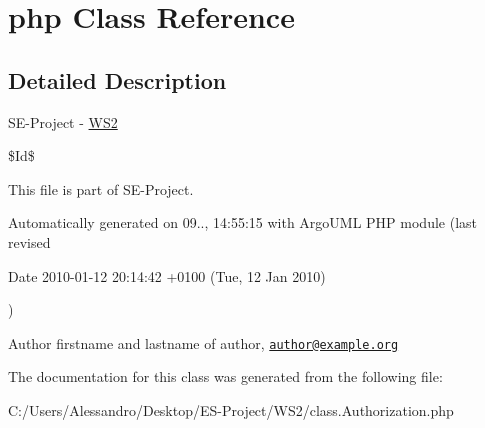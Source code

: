 \hypertarget{class_1_1_authorization_1_1php}{\section{php Class Reference}
\label{class_1_1_authorization_1_1php}
}


\subsection{Detailed Description}
S\+E-\/\+Project -\/ \hyperlink{namespace_w_s2}{W\+S2}

\$\+Id\$

This file is part of S\+E-\/\+Project.

Automatically generated on 09.., 14\+:55\+:15 with Argo\+U\+M\+L P\+H\+P module (last revised \begin{DoxyParagraph}{Date}
2010-\/01-\/12 20\+:14\+:42 +0100 (Tue, 12 Jan 2010) 
\end{DoxyParagraph}
)

\begin{DoxyAuthor}{Author}
firstname and lastname of author, \href{mailto:author@example.org}{\tt author@example.\+org} 
\end{DoxyAuthor}


The documentation for this class was generated from the following file\+:\begin{DoxyCompactItemize}
\item 
C\+:/\+Users/\+Alessandro/\+Desktop/\+E\+S-\/\+Project/\+W\+S2/class.\+Authorization.\+php\end{DoxyCompactItemize}
